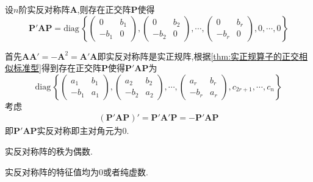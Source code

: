 \begin{green}
    \begin{corollary}[实反对称阵的正交相似标准型]\label{cor:实反对称阵的正交相似标准型}
        设$n$阶实反对称阵$\bm{A}$,则存在正交阵$\bm{P}$使得\[
        \bm{P}'\bm{AP}=\mathrm{diag}\,\left\{
            \begin{pmatrix}
                0&b_1\\
                -b_1&0
            \end{pmatrix},
            \begin{pmatrix}
                0&b_2\\
                -b_2&0
            \end{pmatrix},
            \cdots,
            \begin{pmatrix}
                0&b_r\\
                -b_r&0
            \end{pmatrix},
            0,\cdots,0
        \right\}\]
    \end{corollary}
    \begin{Proof}
        首先$\bm{AA}'=-\bm{A}^2=\bm{A}'\bm{A}$即实反对称阵是实正规阵,根据\cref{thm:实正规算子的正交相似标准型}得到存在正交阵$\bm{P}$使得$\bm{P}'\bm{AP}$为\[
        \mathrm{diag}\,\left\{
            \begin{pmatrix}
                a_1&b_1\\
                -b_1&a_1
            \end{pmatrix},\begin{pmatrix}
                a_2&b_2\\
                -b_2&a_2
            \end{pmatrix},\cdots,\begin{pmatrix}
                a_r&b_r\\
                -b_r&a_r
                \end{pmatrix},c_{2r+1},\cdots,c_n
        \right\}
        \]考虑\begin{align*}
            \left(
                \bm{P}'\bm{AP}
            \right)'=\bm{P}'\bm{A}'\bm{P}=-\bm{P}'\bm{AP}
        \end{align*}即$\bm{P}'\bm{AP}$实反对称即主对角元为$0$.
    \end{Proof}
\end{green}
\begin{green}
    \begin{corollary}[实反对称阵的秩]\label{cor:实反对称阵的秩}
        实反对称阵的秩为偶数.
    \end{corollary}
\end{green}
\begin{green}
    \begin{corollary}[实反对称阵的特征值]\label{cor:实反对称阵的特征值}
        实反对称阵的特征值均为$0$或者纯虚数.
    \end{corollary}
\end{green}
\newpage
